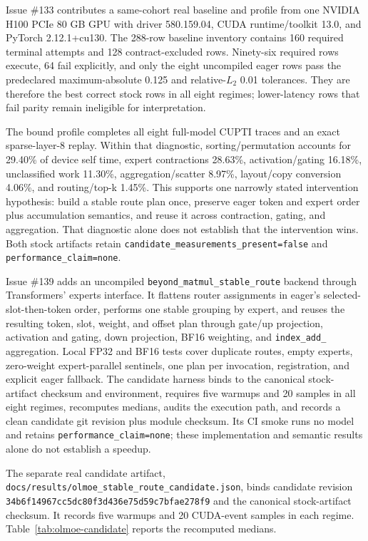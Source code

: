 \documentclass[11pt]{article}
\begin{document}
Issue \#133 contributes a same-cohort real baseline and profile from one NVIDIA
H100 PCIe 80 GB GPU with driver 580.159.04, CUDA runtime/toolkit 13.0, and
PyTorch 2.12.1+cu130. The 288-row baseline inventory contains 160 required
terminal attempts and 128 contract-excluded rows. Ninety-six required rows
execute, 64 fail explicitly, and only the eight uncompiled eager rows pass the
predeclared maximum-absolute 0.125 and relative-$L_2$ 0.01 tolerances. They are
therefore the best correct stock rows in all eight regimes; lower-latency rows
that fail parity remain ineligible for interpretation.

The bound profile completes all eight full-model CUPTI traces and an exact
sparse-layer-8 replay. Within that diagnostic, sorting/permutation accounts for
29.40\% of device self time, expert contractions 28.63\%, activation/gating
16.18\%, unclassified work 11.30\%, aggregation/scatter 8.97\%, layout/copy
conversion 4.06\%, and routing/top-k 1.45\%. This supports one narrowly stated
intervention hypothesis: build a stable route plan once, preserve eager token
and expert order plus accumulation semantics, and reuse it across contraction,
gating, and aggregation. That diagnostic alone does not establish that the
intervention wins. Both stock artifacts retain
\texttt{candidate\_measurements\_present=false} and
\texttt{performance\_claim=none}.

Issue \#139 adds an uncompiled
\texttt{beyond\_matmul\_stable\_route} backend through Transformers' experts
interface. It flattens router assignments in eager's selected-slot-then-token
order, performs one stable grouping by expert, and reuses the resulting token,
slot, weight, and offset plan through gate/up projection, activation and gating,
down projection, BF16 weighting, and \texttt{index\_add\_} aggregation. Local
FP32 and BF16 tests cover duplicate routes, empty experts, zero-weight
expert-parallel sentinels, one plan per invocation, registration, and explicit
eager fallback. The candidate harness binds to the canonical stock-artifact
checksum and environment, requires five warmups and 20 samples in all eight
regimes, recomputes medians, audits the execution path, and records a clean
candidate git revision plus module checksum. Its CI smoke runs no model and
retains \texttt{performance\_claim=none}; these implementation and semantic
results alone do not establish a speedup.

The separate real candidate artifact,
\texttt{docs/results/olmoe\_stable\_route\_candidate.json}, binds candidate
revision \texttt{34b6f14967cc5dc80f3d436e75d59c7bfae278f9} and the canonical
stock-artifact checksum. It records five warmups and 20 CUDA-event samples in
each regime. Table~\ref{tab:olmoe-candidate} reports the recomputed medians.
\end{document}
